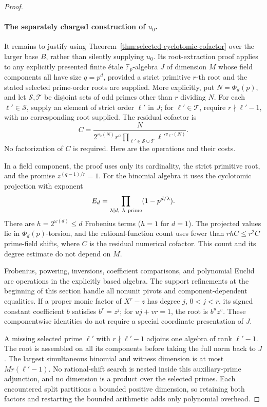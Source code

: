 \documentclass[11pt]{article}
\theoremstyle{definition}
\theoremstyle{remark}
\begin{document}
\begin{proof}
\paragraph{The separately charged construction of \(u_0\).}
It remains to justify using
Theorem~\ref{thm:selected-cyclotomic-cofactor} over the larger
base \(B\), rather than silently supplying \(u_0\).
Its root-extraction proof applies to any explicitly presented
finite \'{e}tale \(\mathbb F_p\)-algebra \(J\) of dimension \(M\)
whose field components all have size \(q=p^d\), provided a
strict primitive \(r\)-th root and the stated selected
prime-order roots are supplied.
More explicitly, put \(N=\Phi_d(p)\), and let
\(\mathcal S,\mathcal T\) be disjoint sets of odd primes other
than \(r\) dividing \(N\).
For each \(\ell'\in\mathcal S\), supply an element of strict
order \(\ell'\) in \(J\); for \(\ell'\in\mathcal T\), require
\(r\nmid\ell'-1\), with no corresponding root supplied.
The residual cofactor is
\[
 C=\frac{N}{2^{v_2(N)}r^a
          \prod_{\ell'\in\mathcal S\cup\mathcal T}
                    \ell'^{v_{\ell'}(N)}}.
\]
No factorization of \(C\) is required.
Here are the operations and their costs.

In a field component, the proof uses only its cardinality,
the strict primitive root, and the promise
\(z^{(q-1)/r}=1\).  For the binomial algebra it uses the
cyclotomic projection with exponent
\[
                  E_d=\prod_{\lambda\mid d,\ \lambda\ {\rm prime}}
                                   (1-p^{d/\lambda}).
\]
There are \(h=2^{\omega(d)}\leq d\) Frobenius terms
(\(h=1\) for \(d=1\)).
The projected values lie in \(\Phi_d(p)\)-torsion, and the
rational-function count uses fewer than \(rhC\leq r^2C\)
prime-field shifts, where \(C\) is the residual numerical cofactor.
This count and its degree estimate do not depend on \(M\).

Frobenius, powering, inversions, coefficient comparisons,
and polynomial Euclid are operations in the explicitly based algebra.
The support refinements at the beginning of this section handle
all nonunit pivots and component-dependent equalities.
If a proper monic factor of \(X^r-z\) has degree \(j\), \(0<j<r\),
its signed constant coefficient \(b\) satisfies \(b^r=z^j\);
for \(uj+vr=1\), the root is \(b^u z^v\).
These componentwise identities do not require a special
coordinate presentation of \(J\).

A missing selected prime \(\ell'\) with \(r\nmid\ell'-1\)
adjoins one algebra of rank \(\ell'-1\).
The root is assembled on all its components before taking
the full norm back to \(J\).
The largest simultaneous binomial and witness dimension is at most
\(Mr(\ell'-1)\).  No rational-shift search is nested inside
this auxiliary-prime adjunction, and no dimension is a product
over the selected primes.  Each encountered split partitions
a bounded positive dimension, so retaining both factors and
restarting the bounded arithmetic adds only polynomial overhead.


\end{proof}
\end{document}
